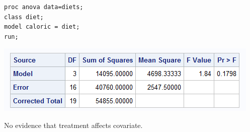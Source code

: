 \begin{small}
\begin{verbatim}
proc anova data=diets;
class diet;
model caloric = diet;
run;
\end{verbatim}
\end{small}

\begin{flushleft}
\includegraphics{DietsCaloricANOVA}
\end{flushleft}

No evidence that treatment affects covariate.\\~\\




